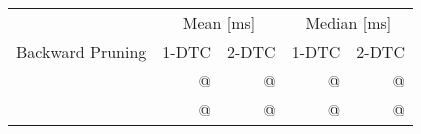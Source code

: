 \begin{tabular}{crrrr}
	\toprule
	                 & \multicolumn{2}{c}{Mean [\si{\milli\second}]} & \multicolumn{2}{c}{Median [\si{\milli\second}]}                 \\
	Backward Pruning & 1-DTC                                         & 2-DTC                                           & 1-DTC & 2-DTC \\
	\midrule
	\xmark           & @                                             & @                                               & @     & @     \\
	\cmark           & @                                             & @                                               & @     & @     \\
	\bottomrule
\end{tabular}
